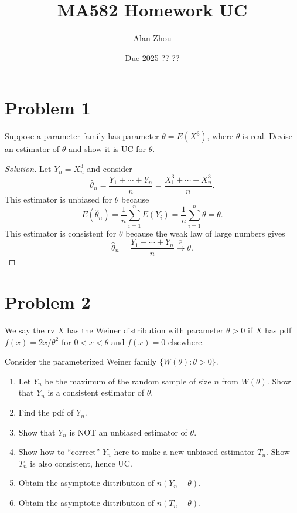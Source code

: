 \documentclass{article}
\title{MA582 Homework UC}
\author{Alan Zhou}
\date{Due 2025-??-??}
\begin{document}
\maketitle


\section{Problem 1}

Suppose a parameter family has parameter $\theta = E(X^3)$, where $\theta$ is real. Devise an estimator of $\theta$ and show it is UC for $\theta$.

\begin{proof}[Solution]
Let $Y_n = X_n^3$ and consider
\begin{equation*}
\hat{\theta}_n = \frac{Y_1 + \cdots + Y_n}{n} = \frac{X_1^3 + \cdots + X_n^3}{n}.
\end{equation*}
This estimator is unbiased for $\theta$ because
\begin{equation*}
E(\hat{\theta}_n) = \frac{1}{n}\sum_{i = 1}^n E(Y_i) = \frac{1}{n}\sum_{i = 1}^n \theta = \theta.
\end{equation*}
This estimator is consistent for $\theta$ because the weak law of large numbers gives
\begin{equation*}
\hat{\theta}_n = \frac{Y_1 + \cdots + Y_n}{n}\stackrel{p}{\longrightarrow}\theta.
\end{equation*}
\end{proof}



\section{Problem 2}

We say the rv $X$ has the Weiner distribution with parameter $\theta > 0$ if $X$ has pdf $f(x) = 2x/\theta^2$ for $0 < x < \theta$ and $f(x) = 0$ elsewhere.

Consider the parameterized Weiner family $\{W(\theta) : \theta > 0\}$.

\begin{enumerate}[label=(\alph*)]
\item Let $Y_n$ be the maximum of the random sample of size $n$ from $W(\theta)$. Show that $Y_n$ is a consistent estimator of $\theta$.
\item Find the pdf of $Y_n$.
\item Show that $Y_n$ is NOT an unbiased estimator of $\theta$.
\item Show how to ``correct'' $Y_n$ here to make a new unbiased estimator $T_n$. Show $T_n$ is also consistent, hence UC.
\item Obtain the asymptotic distribution of $n(Y_n - \theta)$.
\item Obtain the asymptotic distribution of $n(T_n - \theta)$.
\end{enumerate}
\end{document}
